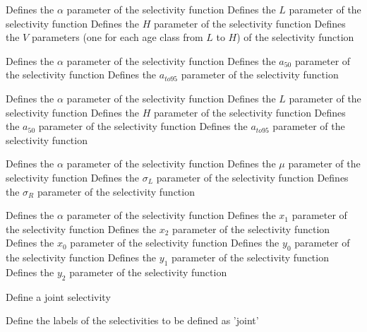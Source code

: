  {Defines the $\alpha$ parameter of the selectivity function}
 {Defines the $L$ parameter of the selectivity function}
 {Defines the $H$ parameter of the selectivity function}
 {Defines the $V$ parameters (one for each age class from $L$ to $H$) of the selectivity function}
\par\textbf{}\par
{} {Defines the $\alpha$ parameter of the selectivity function}
 {Defines the $a_{50}$ parameter of the selectivity function}
 {Defines the $a_{to95}$ parameter of the selectivity function}
\par\textbf{}\par
{} {Defines the $\alpha$ parameter of the selectivity function}
 {Defines the $L$ parameter of the selectivity function}
 {Defines the $H$ parameter of the selectivity function}
 {Defines the $a_{50}$ parameter of the selectivity function}
 {Defines the $a_{to95}$ parameter of the selectivity function}
\par\textbf{}\par
{} {Defines the $\alpha$ parameter of the selectivity function}
 {Defines the $\mu$ parameter of the selectivity function}
 {Defines the $\sigma_L$ parameter of the selectivity function}
 {Defines the $\sigma_R$ parameter of the selectivity function}
\par\textbf{}\par
{} {Defines the $\alpha$ parameter of the selectivity function}
 {Defines the $x_1$ parameter of the selectivity function}
 {Defines the $x_2$ parameter of the selectivity function}
 {Defines the $x_0$ parameter of the selectivity function}
 {Defines the $y_0$ parameter of the selectivity function}
 {Defines the $y_1$ parameter of the selectivity function}
 {Defines the $y_2$ parameter of the selectivity function}
\par{} {Define a joint selectivity}\par
{} {Define the labels of the selectivities to be defined as 'joint'}
